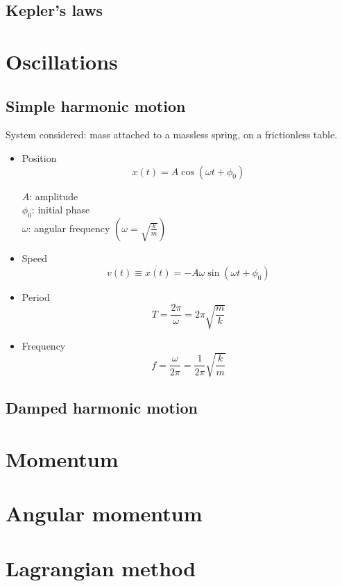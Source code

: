     \subsection{Kepler's laws}
\section{Oscillations}
    \subsection{Simple harmonic motion}
        System considered: mass attached to a massless spring, on a frictionless table.
        \begin{itemize}
            \item Position
                \begin{equation}
                    x(t)=A\cos(\omega t+\phi_0)
                \end{equation}
                \begin{flushleft}
                    $A$: amplitude \\
                    $\phi_0$: initial phase \\
                    $\omega$: angular frequency $\left(\omega=\sqrt{\frac{k}{m}}\right)$
                \end{flushleft}
            \item Speed
                \begin{equation}
                    v(t)\equiv \dot{x(t)}=-A\omega\sin(\omega t+\phi_0)
                \end{equation}
            \item Period
                \begin{equation}
                    T=\frac{2\pi}{\omega}=2\pi\sqrt{\frac{m}{k}}
                \end{equation}
            \item Frequency
                \begin{equation}
                    f=\frac{\omega}{2\pi}=\frac{1}{2\pi}\sqrt{\frac{k}{m}}
                \end{equation}
        \end{itemize}
    \subsection{Damped harmonic motion}
\section{Momentum}
\section{Angular momentum}
\section{Lagrangian method}